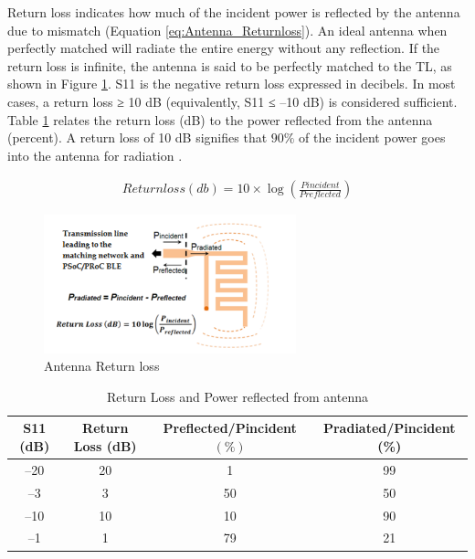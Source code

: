 \indent  Return loss indicates how much of the incident power is reflected by the antenna due to mismatch (Equation \ref{eq:Antenna_Returnloss}).
An ideal antenna when perfectly matched will radiate the entire energy without any reflection. If the return loss is infinite, the antenna is said to be perfectly matched to the TL, as shown in Figure \ref{fig:ANTENNA_RETUNRNLOSS}. S11 is the negative return loss expressed in decibels. In most cases, a return loss ≥ 10 dB (equivalently, S11 ≤ –10 dB) is considered sufficient. Table \ref{tb:ANTENNA_RETURNlOSS_TABLE} relates the return loss (dB) to the power reflected from the antenna (percent). 
A return loss of 10 dB signifies that $90\%$ of the incident power goes into the antenna for radiation \cite{AN91445}.

\begin{equation}\label{eq:Antenna_Returnloss}
    \begin{split}
        Returnloss(db) = 10 \times \log( \frac{Pincident}{Preflected})
    \end{split}
\end{equation}

\begin{figure}[h]
	\centering
	\includegraphics[width=0.65\textwidth]{Chap03/Figures/Antenna_ReturnLoss.PNG}
	\caption{Antenna Return loss}
	\label{fig:ANTENNA_RETUNRNLOSS}
\end{figure}

\begin{table}[h]
	\label{tb:ANTENNA_RETURNlOSS_TABLE}
	\begin{tabular}{|c|c|c|c| }
		\hline 
		S11 (dB) & Return Loss (dB) & Preflected/Pincident $(\%)$ & Pradiated/Pincident (\%) \\ 
		\hline
		–20 &20 &1 &99\\
		\hline
		–3 &3 &50 &50\\
		\hline
		–10 &10 &10& 90\\
		\hline
		–1 &1 &79 &21\\
		\hline
	\end{tabular}
	\caption{Return Loss and Power reflected from antenna}
\end{table}



